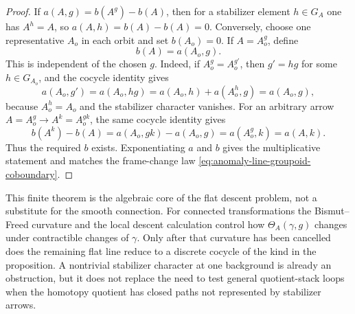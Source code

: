 \begin{proof}
If \(a(A,g)=b(A^g)-b(A)\), then for a stabilizer element \(h\in G_A\) one has
\(A^h=A\), so \(a(A,h)=b(A)-b(A)=0\).  Conversely, choose one representative
\(A_o\) in each orbit and set \(b(A_o)=0\).  If \(A=A_o^g\), define
\[
  b(A)=a(A_o,g).
\]
This is independent of the chosen \(g\).  Indeed, if \(A_o^g=A_o^{g'}\), then
\(g'=hg\) for some \(h\in G_{A_o}\), and the cocycle identity gives
\[
  a(A_o,g')=a(A_o,hg)=a(A_o,h)+a(A_o^h,g)=a(A_o,g),
\]
because \(A_o^h=A_o\) and the stabilizer character vanishes.  For an arbitrary
arrow \(A=A_o^g\to A^k=A_o^{gk}\), the same cocycle identity gives
\[
  b(A^k)-b(A)
  =
  a(A_o,gk)-a(A_o,g)
  =
  a(A_o^g,k)
  =
  a(A,k).
\]
Thus the required \(b\) exists.  Exponentiating \(a\) and \(b\) gives the
multiplicative statement and matches the frame-change law
\eqref{eq:anomaly-line-groupoid-coboundary}.
\end{proof}

This finite theorem is the algebraic core of the flat descent problem, not a
substitute for the smooth connection.  For connected transformations the
Bismut--Freed curvature and the local descent calculation control how
\(\Theta_A(\gamma,g)\) changes under contractible changes of \(\gamma\).
Only after that curvature has been cancelled does the remaining flat line
reduce to a discrete cocycle of the kind in the proposition.  A nontrivial
stabilizer character at one background is already an obstruction, but it does
not replace the need to test general quotient-stack loops when the homotopy
quotient has closed paths not represented by stabilizer arrows.

